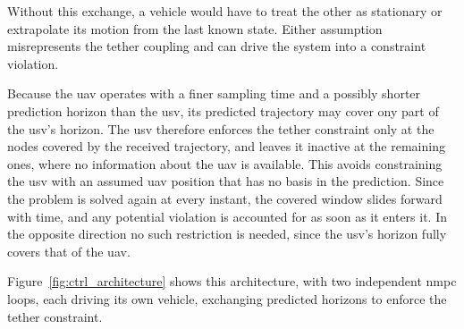 Without this exchange, a vehicle would have to treat the other as stationary or extrapolate its motion from the last known state. Either assumption misrepresents the tether coupling and can drive the system into a constraint violation.

Because the \gls{uav} operates with a finer sampling time and a possibly shorter prediction horizon than the \gls{usv}, its predicted trajectory may cover ony part of the \gls{usv}'s horizon. The \gls{usv} therefore enforces the tether constraint only at the nodes covered by the received trajectory, and leaves it inactive at the remaining ones, where no information about the \gls{uav} is available. This avoids constraining the \gls{usv} with an assumed \gls{uav} position that has no basis in the prediction. Since the problem is solved again at every instant, the covered window slides forward with time, and any potential violation is accounted for as soon as it enters it. In the opposite direction no such restriction is needed, since the \gls{usv}'s horizon fully covers that of the \gls{uav}.

Figure~\ref{fig:ctrl_architecture} shows this architecture, with two independent \gls{nmpc} loops, each driving its own vehicle, exchanging predicted horizons to enforce the tether constraint.

